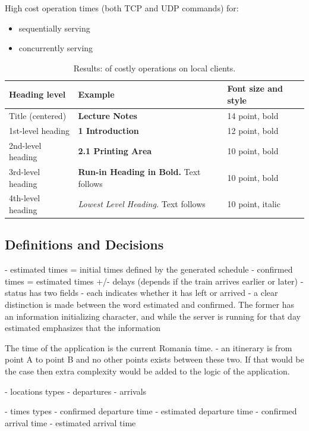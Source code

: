 \documentclass[runningheads]{llncs}
\begin{document}
High cost operation times (both TCP and UDP commands) for:
\begin{itemize}
    \item sequentially serving
    \item concurrently serving
\end{itemize}

\begin{table}
    \caption{Results: of costly operations on local clients.}\label{tab1}
    \begin{tabular}{|l|l|l|}
    \hline
    Heading level &  Example & Font size and style\\
    \hline
    Title (centered) &  {\Large\bfseries Lecture Notes} & 14 point, bold\\
    1st-level heading &  {\large\bfseries 1 Introduction} & 12 point, bold\\
    2nd-level heading & {\bfseries 2.1 Printing Area} & 10 point, bold\\
    3rd-level heading & {\bfseries Run-in Heading in Bold.} Text follows & 10 point, bold\\
    4th-level heading & {\itshape Lowest Level Heading.} Text follows & 10 point, italic\\
    \hline
    \end{tabular}
    \end{table}
    
\subsection{Definitions and Decisions}

- estimated times = initial times defined by the generated schedule
- confirmed times = estimated times +/- delays (depends if the train arrives earlier or later)
- status has two fields - each indicates whether it has left or arrived
- a clear distinction is made between the word estimated and confirmed. The former has an information initializing character, and while the server is running for that day estimated emphasizes that the information

The time of the application is the current Romania time.
- an itinerary is from point A to point B and no other points exists between these two. If that would be the case then extra complexity would be added to the logic of the application.

- locations types
    - departures
    - arrivals

- times types
    - confirmed departure time
    - estimated departure time
    - confirmed arrival time
    - estimated arrival time
\end{document}
